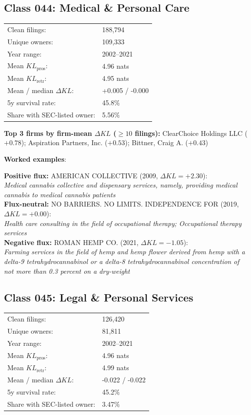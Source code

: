 \subsection*{Class 044: Medical \& Personal Care}
\label{app:industry-044}

\begin{tabular}{ll}
Clean filings: & 188,794 \\
Unique owners: & 109,333 \\
Year range: & 2002--2021 \\
Mean $KL_\text{pros}$: & 4.96 nats \\
Mean $KL_\text{retr}$: & 4.95 nats \\
Mean / median $\Delta KL$: & +0.005 / -0.000 \\
5y survival rate: & 45.8\% \\
Share with SEC-listed owner: & 5.56\% \\
\end{tabular}

\textbf{Top 3 firms by firm-mean $\Delta KL$ ($\geq 10$ filings):} ClearChoice Holdings LLC ($+0.78$); Aspiration Partners, Inc. ($+0.53$); Bittner, Craig A. ($+0.43$)

\textbf{Worked examples}:

  \textbf{Positive flux:} \textsc{AMERICAN COLLECTIVE} (2009, $\Delta KL=+2.30$):\\
  \textit{Medical cannabis collective and dispensary services, namely, providing medical cannabis to medical cannabis patients}\\
  \textbf{Flux-neutral:} \textsc{NO BARRIERS. NO LIMITS. INDEPENDENCE FOR} (2019, $\Delta KL=+0.00$):\\
  \textit{Health care consulting in the field of occupational therapy; Occupational therapy services}\\
  \textbf{Negative flux:} \textsc{ROMAN HEMP CO.} (2021, $\Delta KL=-1.05$):\\
  \textit{Farming services in the field of hemp and hemp flower derived from hemp with a delta-9 tetrahydrocannabinol or a delta-8 tetrahydrocannabinol concentration of not more than 0.3 percent on a dry-weight}\\

\subsection*{Class 045: Legal \& Personal Services}
\label{app:industry-045}

\begin{tabular}{ll}
Clean filings: & 126,420 \\
Unique owners: & 81,811 \\
Year range: & 2002--2021 \\
Mean $KL_\text{pros}$: & 4.96 nats \\
Mean $KL_\text{retr}$: & 4.99 nats \\
Mean / median $\Delta KL$: & -0.022 / -0.022 \\
5y survival rate: & 45.2\% \\
Share with SEC-listed owner: & 3.47\% \\
\end{tabular}

